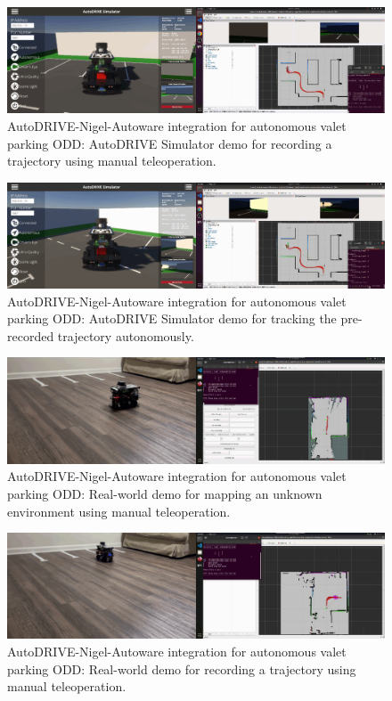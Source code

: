 \begin{figure}[H]
    \centering
    \includegraphics[width=\linewidth]{Figures/fig20.png}
    \caption{AutoDRIVE-Nigel-Autoware integration for autonomous valet parking ODD: AutoDRIVE Simulator demo for recording a trajectory using manual teleoperation.}
    \label{fig: figure20}
\end{figure}

\begin{figure}[H]
    \centering
    \includegraphics[width=\linewidth]{Figures/fig21.png}
    \caption{AutoDRIVE-Nigel-Autoware integration for autonomous valet parking ODD: AutoDRIVE Simulator demo for tracking the pre-recorded trajectory autonomously.}
    \label{fig: figure21}
\end{figure}

\begin{figure}[H]
    \centering
    \includegraphics[width=\linewidth]{Figures/fig22.png}
    \caption{AutoDRIVE-Nigel-Autoware integration for autonomous valet parking ODD: Real-world demo for mapping an unknown environment using manual teleoperation.}
    \label{fig: figure22}
\end{figure}

\begin{figure}[H]
    \centering
    \includegraphics[width=\linewidth]{Figures/fig23.png}
    \caption{AutoDRIVE-Nigel-Autoware integration for autonomous valet parking ODD: Real-world demo for recording a trajectory using manual teleoperation.}
    \label{fig: figure23}
\end{figure}

